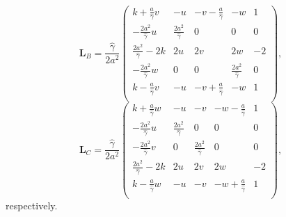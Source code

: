 \documentclass[review]{elsarticle}
\newcommand{\fr}{\frac}
\newcommand{\ga}{\gamma}
\newcommand{\bL}{\mathbf  L}
\begin{document}
\begin{equation}\label{LB-3d}
   \bL_B = \fr{\hat \ga}{2 a^2} \left( \begin{array}{ccccc}
  k + \fr{a}{\hat \ga} v & -u & -v -\fr{a}{\hat \ga} & -w & 1 \\
  -\fr{2a^2}{\hat \ga}u & \fr{2a^2}{\hat \ga} & 0 & 0 & 0 \\
  \fr{2a^2}{\hat \ga} - 2k & 2u & 2v & 2w & -2 \\
  -\fr{2a^2}{\hat \ga}w & 0 & 0 & \fr{2a^2}{\hat \ga} & 0 \\
  k - \fr{a}{\hat \ga} v & -u & -v + \fr{a}{\hat \ga} & -w & 1 \\
  \end{array} \right),
\end{equation}
\begin{equation}\label{LC-3d}
   \bL_C = \fr{\hat \ga}{2 a^2} \left( \begin{array}{ccccc}
  k + \fr{a}{\hat \ga} w & -u & -v & -w -\fr{a}{\hat \ga} & 1 \\
  -\fr{2a^2}{\hat \ga}u & \fr{2a^2}{\hat \ga} & 0 & 0 & 0 \\
  -\fr{2a^2}{\hat \ga}v & 0 & \fr{2a^2}{\hat \ga} & 0 & 0 \\
  \fr{2a^2}{\hat \ga} - 2k & 2u & 2v & 2w & -2 \\
  k - \fr{a}{\hat \ga} w & -u & -v & -w + \fr{a}{\hat \ga} & 1 \\
  \end{array} \right),
\end{equation}
respectively.
\end{document}
